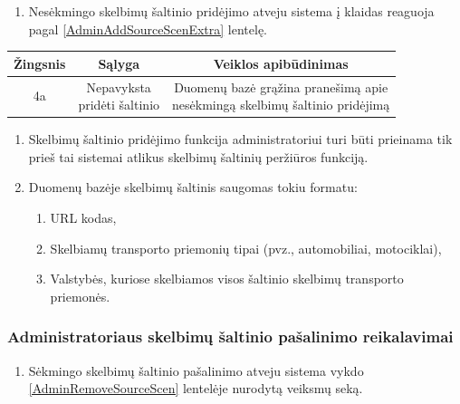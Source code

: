 \documentclass[12pt]{article}
\begin{document}
	\begin{enumerate}[resume,labelindent=10pt,leftmargin=2.2cm]
		\item Nesėkmingo skelbimų šaltinio pridėjimo atveju sistema į klaidas reaguoja pagal \ref{AdminAddSourceScenExtra} lentelę.
	\end{enumerate}

		\begin{center}
		\begin{tabular}{ | c | c | c | }
			\hline
			Žingsnis & Sąlyga         & Veiklos apibūdinimas \\ \hline
			4a       & \makecell{Nepavyksta \\ pridėti šaltinio} & \makecell{Duomenų bazė grąžina pranešimą apie \\ nesėkmingą skelbimų šaltinio pridėjimą} \\ \hline
		\end{tabular}
		\end{center}
		\bigskip
		
	\begin{enumerate}[resume,labelindent=10pt,leftmargin=2.2cm]
		\item Skelbimų šaltinio pridėjimo funkcija administratoriui turi būti prieinama tik prieš tai sistemai atlikus skelbimų šaltinių peržiūros funkciją.
		\item Duomenų bazėje skelbimų šaltinis saugomas tokiu formatu:
		
			\begin{enumerate}[label=\theenumi.\arabic{enumii}]
				\item URL kodas,
				\item Skelbiamų transporto priemonių tipai (pvz., automobiliai, motociklai),
				\item Valstybės, kuriose skelbiamos visos šaltinio skelbimų transporto priemonės.
			\end{enumerate}
		 
	\end{enumerate}
	\pagebreak
	
	\subsubsection{Administratoriaus skelbimų šaltinio pašalinimo reikalavimai}
	\begin{enumerate}[labelindent=10pt,leftmargin=2.2cm]
		\item Sėkmingo skelbimų šaltinio pašalinimo atveju sistema vykdo \ref{AdminRemoveSourceScen} lentelėje nurodytą veiksmų seką.
	\end{enumerate}
		
\end{document}
